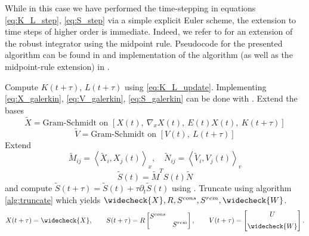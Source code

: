 While in this case we have performed the time-stepping in equations \ref{eq:K_L_step}, 
\ref{eq:S_step} via a simple explicit Euler scheme, the extension to time steps of higher 
order is immediate. Indeed, we refer to \cite{ceruti2024} for an extension of the robust 
integrator using the midpoint rule. Pseudocode for the presented algorithm can be found 
in \cite{robustlowrank} and implementation of the algorithm (as well as the midpoint-rule 
extension) in \cite{BUGimplementation}. 
\begin{algorithm}
\caption{Step Scheme}
\label{alg:step}
\begin{algorithmic}[1]
\State Compute $K(t + \tau)$, $L(t + \tau)$ using \ref{eq:K_L_update}. Implementing 
    \ref{eq:X_galerkin}, \ref{eq:V_galerkin}, \ref{eq:S_galerkin} can be done with 
    \cite[pp. 5]{robustlowrank}. 
\State Extend the bases 
    \begin{equation*}
        \widetilde{ X } = \textrm{Gram-Schmidt on } [ X(t),\ \nabla_x X (t),\ E(t) X(t),\ K(t + \tau) ]
    \end{equation*}
    \begin{equation*}
        \widetilde{ V } = \textrm{Gram-Schmidt on } [ V(t),\ L(t + \tau) ]
    \end{equation*}
\State Extend 
    \begin{equation*}
        \widetilde{ M }_{i j} = \left\langle \widetilde{ X }_i, X_j (t) \right\rangle_x, \quad 
        \widetilde{ N }_{i j} = \left\langle \widetilde{ V }_i, V_j (t) \right\rangle_v
    \end{equation*}
    \begin{equation*}
        \widetilde{ S } (t) = \widetilde{ M }^T S(t) \widetilde{ N }
    \end{equation*}
    and compute $\widetilde{ S }(t + \tau) = \widetilde{ S }(t) + \tau \partial_t \widetilde{ S }(t)$
    using \cite[pp. 6]{robustlowrank}. 
\State Truncate using algorithm \ref{alg:truncate} which yields 
    $\widecheck{ X }, R, S^{cons}, S^{rem}, \widecheck{ W }$.  
\State \Return 
    \begin{equation*}
        X (t + \tau) = \widecheck{ X }, \quad\quad 
        S (t + \tau) = R \begin{bmatrix}
            S^{cons} & \\
            & S^{rem}
        \end{bmatrix}, \quad\quad
        V (t + \tau) = \begin{bmatrix}
            U \\[0.5em] 
            \widecheck{ W }
        \end{bmatrix} . 
    \end{equation*}
\end{algorithmic}
\end{algorithm}

